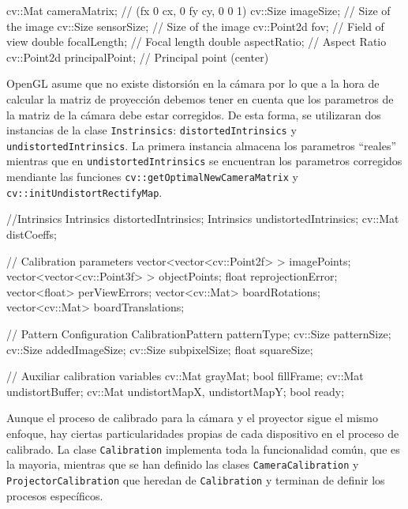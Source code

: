\begin{listing}[
  float=ht,
  language = C++,
  caption  = {Atributos de la clase Intrinsics},
  label    = code:Intrinsics]
 cv::Mat cameraMatrix;       // (fx 0 cx, 0 fy cy, 0 0 1)
 cv::Size imageSize;         // Size of the image
 cv::Size sensorSize;        // Size of the image
 cv::Point2d fov;            // Field of view
 double focalLength;         // Focal length
 double aspectRatio;         // Aspect Ratio
 cv::Point2d principalPoint; // Principal point (center)
\end{listing}

OpenGL asume que no existe distorsión en la cámara por lo que a la hora de calcular la matriz de proyección debemos tener en cuenta que los parametros de la matriz de la cámara debe estar corregidos. De esta forma, se utilizaran dos instancias de la clase \texttt{Instrinsics}: \texttt{distortedIntrinsics} y \texttt{undistortedIntrinsics}. La primera instancia almacena los parametros ``reales'' mientras que en \texttt{undistortedIntrinsics} se encuentran los parametros corregidos mendiante las funciones \texttt{cv::getOptimalNewCameraMatrix} y \texttt{cv::initUndistortRectifyMap}.

\begin{listing}[
  float=ht,
  language = C++,
  caption  = {Atributos de la clase Calibration},
  label    = code:Calibration]
  //Intrinsics
  Intrinsics distortedIntrinsics;
  Intrinsics undistortedIntrinsics;
  cv::Mat distCoeffs;
  
  // Calibration parameters
  vector<vector<cv::Point2f> > imagePoints;
  vector<vector<cv::Point3f> > objectPoints;
  float reprojectionError;
  vector<float> perViewErrors;
  vector<cv::Mat> boardRotations;
  vector<cv::Mat> boardTranslations;

  // Pattern Configuration
  CalibrationPattern patternType;
  cv::Size patternSize;
  cv::Size addedImageSize;
  cv::Size subpixelSize;
  float squareSize;
 
  // Auxiliar calibration variables
  cv::Mat grayMat;
  bool fillFrame;
  cv::Mat undistortBuffer;
  cv::Mat undistortMapX, undistortMapY;
  bool ready;
 \end{listing}

Aunque el proceso de calibrado para la cámara y el proyector sigue el mismo enfoque, hay ciertas particularidades propias de cada dispositivo en el proceso de calibrado. La clase \texttt{Calibration} implementa toda la funcionalidad común, que es la mayoria, mientras que se han definido las clases \texttt{CameraCalibration} y \texttt{ProjectorCalibration} que heredan de \texttt{Calibration} y terminan de definir los procesos específicos.

